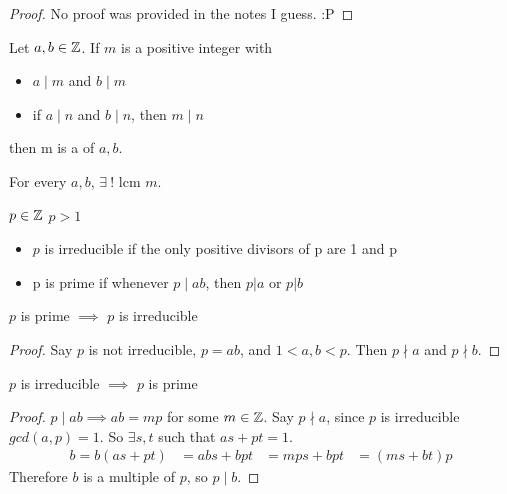 \documentclass[openany]{report}
\begin{document}
\begin{proof}
    No proof was provided in the notes I guess. :P 
\end{proof}
\begin{definition}\label{def:lcm}
    Let $a,b \in \mathbb{Z}$. If $m$ is a positive integer with
    \begin{itemize}
        \item $a\mid m$ and $b \mid m$
        \item if $a \mid n$ and $b \mid n$, then $m \mid n$
    \end{itemize}
    then m is a  of $a,b$.
\end{definition}
\begin{theorem}\label{thm:lcm}
    For every $a,b$, $\exists \ !$ lcm $m$.
\end{theorem}
\begin{definition}
    $p \in \mathbb{Z}$ $p > 1$
    \begin{itemize}
        \item $p$ is irreducible if the only positive divisors of p are 1 and p
        \item p is prime if whenever $p \mid ab$, then $p |a$ or $p |b$
    \end{itemize}
\end{definition}
\begin{prop}
    $p$ is prime $\implies$ $p$ is irreducible
\end{prop}
\begin{proof}
    Say $p$ is not irreducible, $p = ab$, and $1 < a,b < p$. Then $p \nmid a$ and $p \nmid b$.
\end{proof}
\begin{prop}
    $p$ is irreducible $\implies$ $p$ is prime
\end{prop}
\begin{proof}
    $p \mid ab \implies ab = mp$ for some $m \in \mathbb{Z}$. Say $p \nmid a$, since $p$ is irreducible $gcd(a,p) = 1$. So $\exists s,t$ such that $as + pt = 1$. 
    \begin{align*}
      b = b(as +pt) &= abs + bpt  
      &= mps + bpt
      &= (ms + bt)p
    \end{align*}
    Therefore $b$ is a multiple of $p$, so $p \mid b$.
\end{proof}
\end{document}
